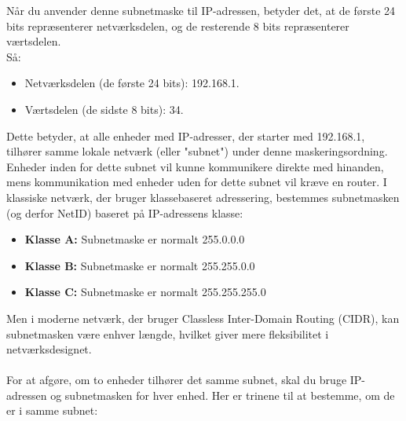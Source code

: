 Når du anvender denne subnetmaske til IP-adressen, betyder det, at de første 24 bits repræsenterer netværksdelen, og de resterende 8 bits repræsenterer værtsdelen.
\\
Så:
\begin{itemize}
	\item Netværksdelen (de første 24 bits): 192.168.1.
	\item Værtsdelen (de sidste 8 bits): 34.
\end{itemize}
Dette betyder, at alle enheder med IP-adresser, der starter med 192.168.1, tilhører samme lokale netværk (eller "subnet") under denne maskeringsordning. Enheder inden for dette subnet vil kunne kommunikere direkte med hinanden, mens kommunikation med enheder uden for dette subnet vil kræve en router.
I klassiske netværk, der bruger klassebaseret adressering, bestemmes subnetmasken (og derfor NetID) baseret på IP-adressens klasse:
\begin{itemize}
	\item \textbf{Klasse A:} Subnetmaske er normalt 255.0.0.0
	\item \textbf{Klasse B:} Subnetmaske er normalt 255.255.0.0
	\item \textbf{Klasse C:} Subnetmaske er normalt 255.255.255.0
\end{itemize}
Men i moderne netværk, der bruger Classless Inter-Domain Routing (CIDR), kan subnetmasken være enhver længde, hvilket giver mere fleksibilitet i netværksdesignet.
\\
\\
For at afgøre, om to enheder tilhører det samme subnet, skal du bruge IP-adressen og subnetmasken for hver enhed. Her er trinene til at bestemme, om de er i samme subnet:
